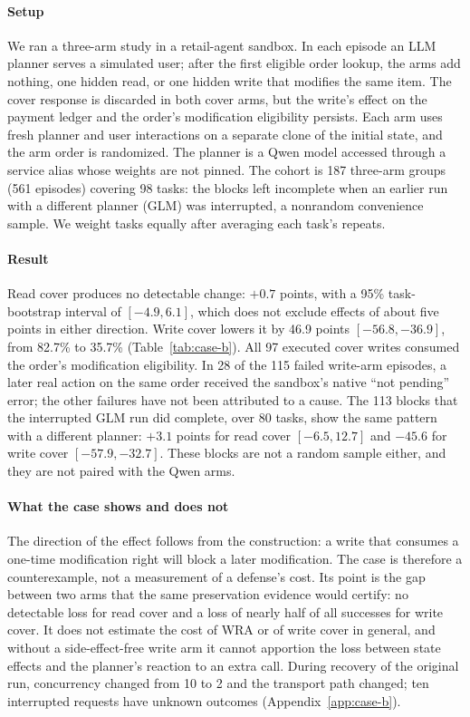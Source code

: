 \paragraph{Setup}
We ran a three-arm study in a retail-agent sandbox. In each episode an LLM planner serves a simulated user; after the first eligible order lookup, the arms add nothing, one hidden read, or one hidden write that modifies the same item. The cover response is discarded in both cover arms, but the write's effect on the payment ledger and the order's modification eligibility persists. Each arm uses fresh planner and user interactions on a separate clone of the initial state, and the arm order is randomized. The planner is a Qwen model accessed through a service alias whose weights are not pinned. The cohort is 187 three-arm groups (561 episodes) covering 98 tasks: the blocks left incomplete when an earlier run with a different planner (GLM) was interrupted, a nonrandom convenience sample. We weight tasks equally after averaging each task's repeats.



\paragraph{Result}
Read cover produces no detectable change: $+0.7$ points, with a 95\% task-bootstrap interval of $[-4.9, 6.1]$, which does not exclude effects of about five points in either direction. Write cover lowers it by 46.9 points $[-56.8, -36.9]$, from 82.7\% to 35.7\% (Table~\ref{tab:case-b}). All 97 executed cover writes consumed the order's modification eligibility. In 28 of the 115 failed write-arm episodes, a later real action on the same order received the sandbox's native ``not pending'' error; the other failures have not been attributed to a cause. The 113 blocks that the interrupted GLM run did complete, over 80 tasks, show the same pattern with a different planner: $+3.1$ points for read cover $[-6.5, 12.7]$ and $-45.6$ for write cover $[-57.9, -32.7]$. These blocks are not a random sample either, and they are not paired with the Qwen arms.

\paragraph{What the case shows and does not}
The direction of the effect follows from the construction: a write that consumes a one-time modification right will block a later modification. The case is therefore a counterexample, not a measurement of a defense's cost. Its point is the gap between two arms that the same preservation evidence would certify: no detectable loss for read cover and a loss of nearly half of all successes for write cover. It does not estimate the cost of WRA or of write cover in general, and without a side-effect-free write arm it cannot apportion the loss between state effects and the planner's reaction to an extra call. During recovery of the original run, concurrency changed from 10 to 2 and the transport path changed; ten interrupted requests have unknown outcomes (Appendix~\ref{app:case-b}).
